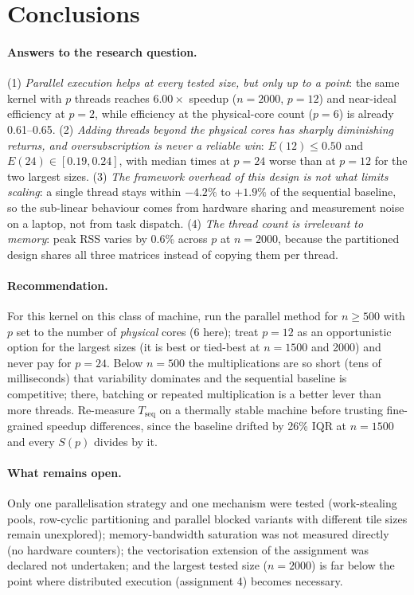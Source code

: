 \documentclass[11pt,a4paper]{article}
\begin{document}
\section{Conclusions}
\label{sec:conclusions}

\paragraph{Answers to the research question.}
(1) \emph{Parallel execution helps at every tested size, but only up to a
point}: the same kernel with $p$ threads reaches $6.00\times$ speedup
($n = 2000$, $p = 12$) and near-ideal efficiency at $p = 2$, while
efficiency at the physical-core count ($p = 6$) is already 0.61--0.65.
(2) \emph{Adding threads beyond the physical cores has sharply
diminishing returns, and oversubscription is never a reliable win}:
$E(12) \le 0.50$ and $E(24) \in [0.19, 0.24]$, with median times at
$p = 24$ worse than at $p = 12$ for the two largest sizes. (3) \emph{The
framework overhead of this design is not what limits scaling}: a single
thread stays within $-4.2\%$ to $+1.9\%$ of the sequential baseline, so
the sub-linear behaviour comes from hardware sharing and measurement
noise on a laptop, not from task dispatch. (4) \emph{The thread count is
irrelevant to memory}: peak RSS varies by 0.6\% across $p$ at $n = 2000$,
because the partitioned design shares all three matrices instead of
copying them per thread.

\paragraph{Recommendation.}
For this kernel on this class of machine, run the parallel method for
$n \ge 500$ with $p$ set to the number of \emph{physical} cores (6 here);
treat $p = 12$ as an opportunistic option for the largest sizes (it is
best or tied-best at $n = 1500$ and 2000) and never pay for $p = 24$.
Below $n = 500$ the multiplications are so short (tens of milliseconds)
that variability dominates and the sequential baseline is competitive;
there, batching or repeated multiplication is a better lever than more
threads. Re-measure $T_{\mathrm{seq}}$ on a thermally stable machine
before trusting fine-grained speedup differences, since the baseline
drifted by 26\% IQR at $n = 1500$ and every $S(p)$ divides by it.

\paragraph{What remains open.} Only one parallelisation strategy and one
mechanism were tested (work-stealing pools, row-cyclic partitioning and
parallel blocked variants with different tile sizes remain unexplored);
memory-bandwidth saturation was not measured directly (no hardware
counters); the vectorisation extension of the assignment was declared not
undertaken; and the largest tested size ($n = 2000$) is far below the
point where distributed execution (assignment 4) becomes necessary.
\end{document}
